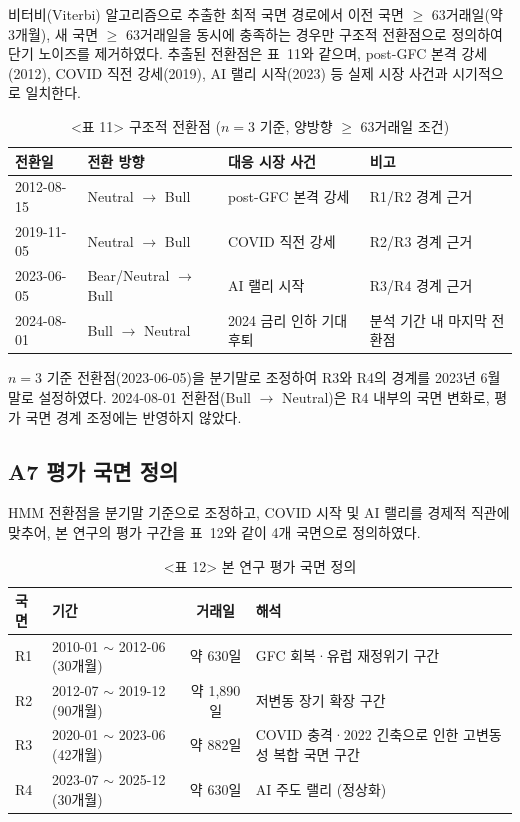 \documentclass{article}
\begin{document}
비터비(Viterbi) 알고리즘으로 추출한 최적 국면 경로에서 이전 국면 $\geq$ 63거래일(약 3개월), 새 국면 $\geq$ 63거래일을 동시에 충족하는 경우만 구조적 전환점으로 정의하여 단기 노이즈를 제거하였다. 추출된 전환점은 표~11와 같으며, post-GFC 본격 강세(2012), COVID 직전 강세(2019), AI 랠리 시작(2023) 등 실제 시장 사건과 시기적으로 일치한다.

\begin{table}[ht]
\centering
\caption{<표 11> 구조적 전환점 ($n=3$ 기준, 양방향 $\geq$ 63거래일 조건)}
\label{tab:a1_breaks}
\begin{tabular}{llll}
\toprule
\textbf{전환일} & \textbf{전환 방향} & \textbf{대응 시장 사건} & \textbf{비고} \\
\midrule
2012-08-15 & Neutral $\rightarrow$ Bull & post-GFC 본격 강세      & R1/R2 경계 근거 \\
2019-11-05 & Neutral $\rightarrow$ Bull & COVID 직전 강세         & R2/R3 경계 근거 \\
2023-06-05 & Bear/Neutral $\rightarrow$ Bull & AI 랠리 시작       & R3/R4 경계 근거 \\
2024-08-01 & Bull $\rightarrow$ Neutral & 2024 금리 인하 기대 후퇴 & 분석 기간 내 마지막 전환점 \\
\bottomrule
\end{tabular}
\end{table}

$n = 3$ 기준 전환점(2023-06-05)을 분기말로 조정하여 R3와 R4의 경계를 2023년 6월 말로 설정하였다. 2024-08-01 전환점(Bull $\rightarrow$ Neutral)은 R4 내부의 국면 변화로, 평가 국면 경계 조정에는 반영하지 않았다.

\subsection*{A7 평가 국면 정의}

HMM 전환점을 분기말 기준으로 조정하고, COVID 시작 및 AI 랠리를 경제적 직관에 맞추어, 본 연구의 평가 구간을 표~12와 같이 4개 국면으로 정의하였다.

\begin{table}[ht]
\centering
\caption{<표 12> 본 연구 평가 국면 정의}
\label{tab:a1_regimes}
\begin{tabular}{llcl}
\toprule
\textbf{국면} & \textbf{기간} & \textbf{거래일} & \textbf{해석} \\
\midrule
R1 & 2010-01 $\sim$ 2012-06 (30개월) & 약 630일   & GFC 회복·유럽 재정위기 구간 \\
R2 & 2012-07 $\sim$ 2019-12 (90개월) & 약 1,890일 & 저변동 장기 확장 구간 \\
R3 & 2020-01 $\sim$ 2023-06 (42개월) & 약 882일   & COVID 충격·2022 긴축으로 인한 고변동성 복합 국면 구간 \\
R4 & 2023-07 $\sim$ 2025-12 (30개월) & 약 630일   & AI 주도 랠리 (정상화) \\
\bottomrule
\end{tabular}
\end{table}
\end{document}
